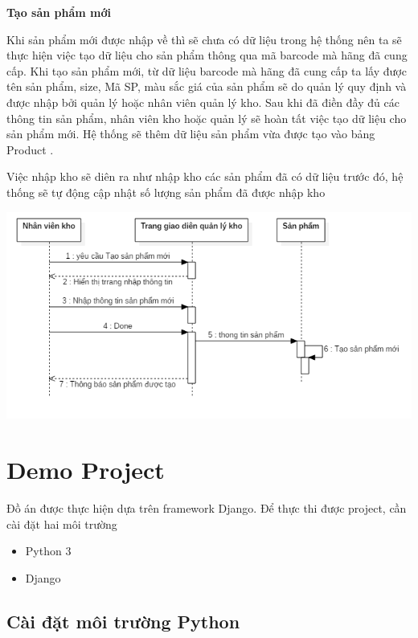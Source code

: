 \documentclass{article}
\begin{document}
\pagebreak

\pagebreak
\centering
\fontsize{14}{20}\selectfont\textbf{Tạo sản phẩm mới}\\


\fontsize{13}{20}\selectfont

Khi sản phẩm mới được nhập về thì sẽ chưa có dữ liệu trong hệ thống nên ta  sẽ thực hiện việc tạo dữ liệu cho sản phẩm thông qua mã barcode mà hãng đã cung cấp.
Khi tạo sản phẩm mới, từ dữ liệu barcode mà hãng đã cung cấp ta lấy được tên sản phẩm, size, Mã SP, màu sắc giá của sản phẩm sẽ do quản lý quy định và được nhập bởi quản lý hoặc nhân viên quản lý kho. 
Sau khi đã điền đầy đủ các thông tin sản phẩm, nhân viên kho hoặc quản lý sẽ hoàn tất việc tạo dữ liệu cho sản phẩm mới. Hệ thống sẽ thêm dữ liệu sản phẩm vừa được tạo vào bảng Product .

Việc nhập kho sẽ diên ra như nhập kho các sản phẩm đã có dữ liệu trước đó, hệ thống sẽ tự động cập nhật số lượng sản phẩm đã được nhập kho 

\includegraphics[scale = 0.8]{12.png}

\pagebreak

\fontsize{16}{20}\selectfont\section{Demo Project}
Đồ án được thực hiện dựa trên framework Django. Để thực thi được project, cần cài đặt hai môi trường
\begin{itemize}
    \item Python 3
    \item Django
\end{itemize}
\fontsize{14}{20}\selectfont\subsection{Cài đặt môi trường Python}
\end{document}
